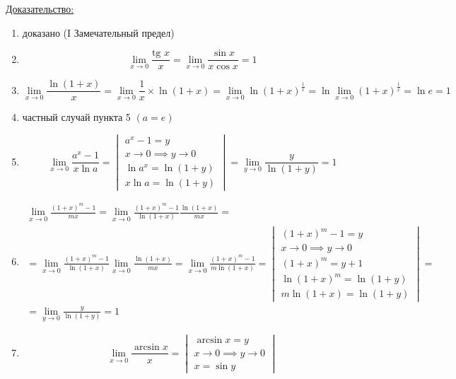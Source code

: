 \documentclass[12pt]{article}
\begin{document}
    \underline{Доказательство:}
    \begin{adjustwidth}{1.5em}{1.5em}
        \begin{enumerate}
            \item доказано (I Замечательный предел)
            \item \[\lim_{x\to 0}\frac{\text{tg } x}{x} = \lim_{x\to 0}\frac{\sin x}{x \cos x} = 1\]
            \item \[\lim_{x\to 0}\frac{\ln(1+x)}{x} = \lim_{x\to 0}\frac{1}{x} \times \ln(1+x) = \lim_{x\to 0}\ln(1+x)^{\frac{1}{x}} = \ln \lim_{x\to 0}(1+x)^{\frac{1}{x}} = \ln e = 1\]
            \item частный случай пункта 5 $(a = e)$
            \item \[\lim_{x\to 0}\frac{a^x-1}{x \ln a} = \begin{vmatrix}
                a^x - 1 = y\\
                x \to 0 \implies y \to 0\\
                \ln a^x = \ln(1+y)\\
                x\ln a = \ln(1+y)
            \end{vmatrix} = \lim_{y\to 0}\frac{y}{\ln(1+y)} = 1\]
            \item \begin{gather*}
                \lim_{x\to 0}\frac{(1+x)^m-1}{mx} = \lim_{x\to 0}\frac{(1+x)^m-1}{\ln(1+x)}\frac{\ln(1+x)}{mx} =\\= \lim_{x\to 0}\frac{(1+x)^m-1}{\ln (1+x)} \lim_{x\to 0}\frac{\ln(1+x)}{mx} = \lim_{x\to 0}\frac{(1+x)^m-1}{m\ln(1+x)} = \begin{vmatrix}
                    (1+x)^m - 1 = y\\
                    x \to 0 \implies y \to 0\\
                    (1+x)^m = y + 1\\
                    \ln(1+x)^m = \ln(1+y)\\
                    m\ln(1+x) = \ln(1+y)
                \end{vmatrix} =\\= \lim_{y\to 0}\frac{y}{\ln(1+y)} = 1
            \end{gather*}
            \item \[\lim_{x\to 0}\frac{\arcsin x}{x} = \begin{vmatrix}
                \arcsin x = y\\
                x \to 0 \implies y \to 0\\
                x = \sin y

\end{vmatrix}\]
\end{enumerate}
\end{adjustwidth}
\end{document}
